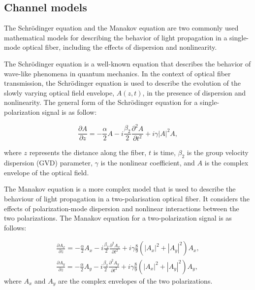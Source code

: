 \subsection{Channel models}

The Schr\"odinger equation and the Manakov equation are two commonly used mathematical models for describing the behavior of light propagation in a single-mode optical fiber, including the effects of dispersion and nonlinearity.

The Schr\"odinger equation is a well-known equation that describes the behavior of wave-like phenomena in quantum mechanics. In the context of optical fiber transmission, the Schr\"odinger equation is used to describe the evolution of the slowly varying optical field envelope, $A(z,t)$, in the presence of dispersion and nonlinearity. The general form of the Schr\"odinger equation for a single-polarization signal is as follow:

\begin{equation}
	\frac{\partial A }{\partial z} = - \frac{\alpha}{2} A - i \frac{\beta_2}{2} \frac{\partial^2 A}{\partial t^2} + i \gamma |A|^2 A {,}
\label{eq:nlse}
\end{equation}

where $z$ represents the distance along the fiber, $t$ is time, $\beta_2$ is the group velocity dispersion (GVD) parameter, $\gamma$ is the nonlinear coefficient, and $A$ is the complex envelope of the optical field.

The Manakov equation is a more complex model that is used to describe the behaviour of light propagation in a two-polarisation optical fiber. It considers the effects of polarization-mode dispersion and nonlinear interactions between the two polarizations. The Manakov equation for a two-polarization signal is as follows:

\begin{gather} 
\frac{\partial A_x}{\partial z} = -\frac{\alpha}{2} A_x - i\frac{\beta_2}{2}\frac{\partial^2 A_x}{\partial t^2} + i\gamma\frac{8}{9}\left(|A_x|^2 + |A_y|^2\right) A_x {,} \nonumber \\
\frac{\partial A_y}{\partial z} = -\frac{\alpha}{2} A_y - i\frac{\beta_2}{2}\frac{\partial^2 A_y}{\partial t^2} + i\gamma\frac{8}{9}\left(|A_x|^2 + |A_y|^2\right) A_y {,}
\label{eq:manakov}
\end{gather}
where $A_x$ and $A_y$ are the complex envelopes of the two polarizations.





